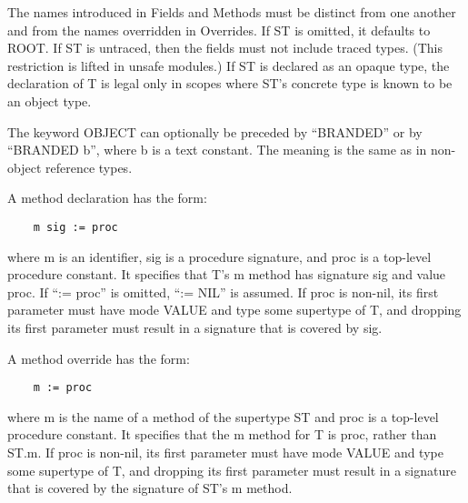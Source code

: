 \documentclass[10pt]{article}
\begin{document}
  The names introduced in Fields and Methods must be distinct from one another and from the names overridden in Overrides. If ST is omitted, it defaults to ROOT. If ST is untraced, then the fields must not include traced types. (This restriction is lifted in unsafe modules.) If ST is declared as an opaque type, the declaration of T is legal only in scopes where ST's concrete type is known to be an object type. 


 The keyword OBJECT can optionally be preceded by ``BRANDED'' or by ``BRANDED b'', where b is a text constant. The meaning is the same as in non-object reference types. 


 A method declaration has the form: 
\begin{verbatim}
    m sig := proc
\end{verbatim}
 where m is an identifier, sig is a procedure signature, and proc is a top-level procedure constant. It specifies that T's m method has signature sig and value proc. If ``:= proc'' is omitted, ``:= NIL'' is assumed. If proc is non-nil, its first parameter must have mode VALUE and type some supertype of T, and dropping its first parameter must result in a signature that is covered by sig. 


 A method override has the form: 
\begin{verbatim}
    m := proc
\end{verbatim}
 where m is the name of a method of the supertype ST and proc is a top-level procedure constant. It specifies that the m method for T is proc, rather than ST.m. If proc is non-nil, its first parameter must have mode VALUE and type some supertype of T, and dropping its first parameter must result in a signature that is covered by the signature of ST's m method. 
\end{document}
